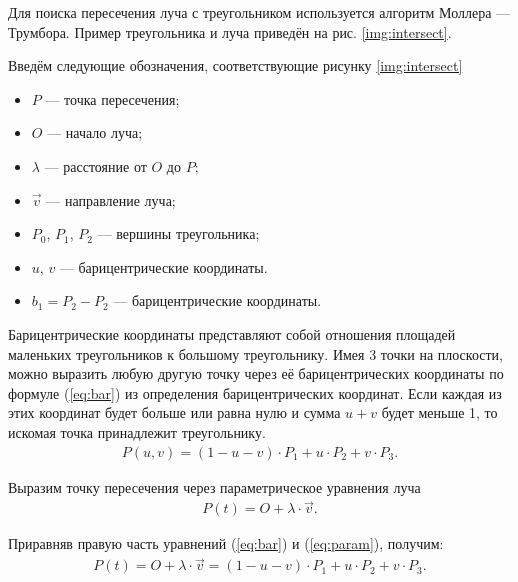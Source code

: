Для поиска пересечения луча с треугольником используется алгоритм Моллера --- Трумбора. Пример треугольника и луча приведён на рис. \ref{img:intersect}.

\clearpage


\quad Введём следующие обозначения, соответствующие рисунку \ref{img:intersect}
\begin{itemize}[label=---]
	\item $P$ --- точка пересечения;
	\item $O$ --- начало луча;
	\item $\lambda$ --- расстояние от $O$ до $P$;
	\item $\vec{v}$ --- направление луча;
	\item $P_{0}$, $P_{1}$, $P_{2}$ --- вершины треугольника;
	\item $u$, $v$ --- барицентрические координаты.
	\item $b_{1} = P_{2} - P_{2}$ --- барицентрические координаты.
\end{itemize}

Барицентрические координаты представляют собой отношения площадей маленьких треугольников к большому треугольнику. Имея 3 точки на плоскости, можно выразить любую другую точку через её барицентрических координаты по формуле (\ref{eq:bar}) из определения барицентрических координат. Если каждая из этих координат будет больше или равна нулю и сумма $u + v$ будет меньше 1, то искомая точка принадлежит треугольнику. 
\begin{equation} \label{eq:bar}
	\begin{aligned}
		P(u, v) = (1 - u - v)\cdot P_{1} + u\cdot P_{2} + v\cdot P_{3}.
	\end{aligned}
\end{equation}

Выразим точку пересечения через параметрическое уравнения луча
\begin{equation} \label{eq:param}
	\begin{aligned}
		P(t) = O + \lambda\cdot \vec{v}.
	\end{aligned}
\end{equation}

Приравняв правую часть уравнений (\ref{eq:bar}) и (\ref{eq:param}), получим:
\begin{equation} \label{eq:res}
	\begin{aligned}
			P(t) = O + \lambda \cdot \vec{v} = (1 - u - v)\cdot P_{1} + u\cdot P_{2} + v\cdot P_{3}.
	\end{aligned}
\end{equation}

